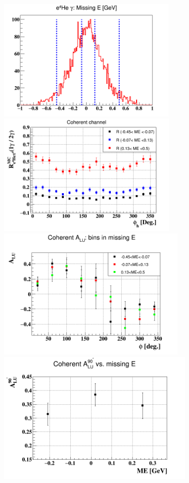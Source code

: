 \begin{enumerate}
\begin{enumerate}
\newpage
    \begin{figure}[tbp]
   \includegraphics[height=6.0cm]{fig/new_ME_Coh_bins.png}
   \includegraphics[height=6.0cm]{fig/e4Hegamma_e4Hepi0_Phi_ME.png}
   \hspace{-3.0cm} \includegraphics[height=6.5cm]{fig/new_BSA_coherent_ME.png}
   \hspace{-1.0cm} \includegraphics[height=6.5cm]{fig/new_coh_ME_alpha.png}

\end{figure}
\end{enumerate}
\end{enumerate}
